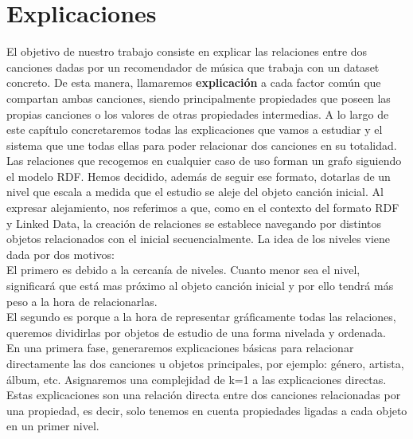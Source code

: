 \chapter{Explicaciones}
\label{cap:explicaciones}

El objetivo de nuestro trabajo consiste en explicar las relaciones entre dos canciones dadas por un recomendador de música que trabaja con un dataset concreto. De esta manera, llamaremos \textbf{explicación} a cada factor común que compartan ambas canciones, siendo principalmente propiedades que poseen las propias canciones o los valores de otras propiedades intermedias. A lo largo de este capítulo concretaremos todas las explicaciones que vamos a estudiar y el sistema que une todas ellas para poder relacionar dos canciones en su totalidad.\\

Las relaciones que recogemos en cualquier caso de uso forman un grafo siguiendo el modelo RDF. Hemos decidido, además de seguir ese formato, dotarlas de un nivel que escala a medida que el estudio se aleje del objeto canción inicial. Al expresar alejamiento, nos referimos a que, como en el contexto del formato RDF y Linked Data, la creación de relaciones se establece navegando por distintos objetos relacionados con el inicial secuencialmente. La idea de los niveles viene dada por dos motivos:\\

El primero es debido a la cercanía de niveles. Cuanto menor sea el nivel, significará que está mas próximo al objeto canción inicial y por ello tendrá más peso a la hora de relacionarlas.\\

El segundo es porque a la hora de representar gráficamente todas las relaciones, queremos dividirlas por objetos de estudio de una forma nivelada y ordenada.\\

En una primera fase, generaremos explicaciones básicas para relacionar directamente las dos canciones u objetos principales, por ejemplo: género, artista, álbum, etc. Asignaremos una complejidad de k=1 a las explicaciones directas. Estas explicaciones son una relación directa entre dos canciones relacionadas por una propiedad, es decir, solo tenemos en cuenta propiedades ligadas a cada objeto en un primer nivel.\\

